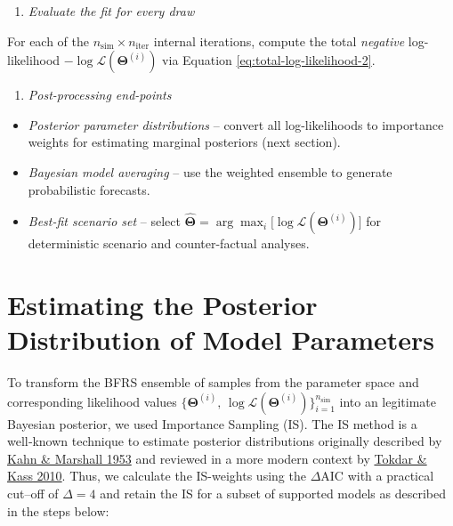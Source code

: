 \documentclass[
]{book}
\providecommand{\tightlist}{%
  \setlength{\itemsep}{0pt}\setlength{\parskip}{0pt}}
\begin{document}
\begin{enumerate}
\def\labelenumi{\arabic{enumi}.}
\setcounter{enumi}{2}
\tightlist
\item
  \emph{Evaluate the fit for every draw}
\end{enumerate}

For each of the \(n_{\text{sim}} \times n_{\text{iter}}\) internal iterations, compute the total \emph{negative} log-likelihood \(-\log\mathcal{L}(\boldsymbol{\Theta}^{(i)})\) via Equation \eqref{eq:total-log-likelihood-2}.

\begin{enumerate}
\def\labelenumi{\arabic{enumi}.}
\setcounter{enumi}{3}
\tightlist
\item
  \emph{Post-processing end-points}
\end{enumerate}

\begin{itemize}
\tightlist
\item
  \emph{Posterior parameter distributions} -- convert all log-likelihoods to importance weights for estimating marginal posteriors (next section).\\
\item
  \emph{Bayesian model averaging} -- use the weighted ensemble to generate probabilistic forecasts.\\
\item
  \emph{Best-fit scenario set} -- select \(\hat{\boldsymbol{\Theta}} = \arg\max_i\bigl[\log\mathcal{L}(\boldsymbol{\Theta}^{(i)})\bigr]\) for deterministic scenario and counter-factual analyses.
\end{itemize}

\section{Estimating the Posterior Distribution of Model Parameters}\label{estimating-the-posterior-distribution-of-model-parameters}

To transform the BFRS ensemble of samples from the parameter space and corresponding likelihood values
\(\bigl\{\boldsymbol{\Theta}^{(i)},\,\log\mathcal{L}(\boldsymbol{\Theta}^{(i)})\bigr\}_{i=1}^{n_{\text{sim}}}\) into an legitimate Bayesian posterior, we used Importance Sampling (IS). The IS method is a well‑known technique to estimate posterior distributions originally described by \href{https://pubsonline.informs.org/doi/10.1287/opre.1.5.263}{Kahn \& Marshall 1953} and reviewed in a more modern context by \href{https://doi.org/10.1002/wics.56}{Tokdar \& Kass 2010}. Thus, we calculate the IS-weights using the \(\Delta \text{AIC}\) with a practical cut--off of \(\Delta=4\) and retain the IS for a subset of supported models as described in the steps below:
\end{document}
